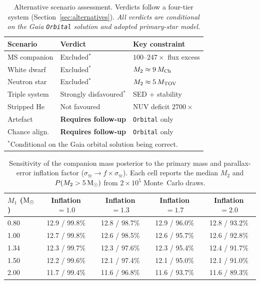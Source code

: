 \documentclass[usenatbib,fleqn]{mnras}
\newcommand{\Msun}{{\rm M}_\odot}
\begin{document}
\begin{table}
\centering
\caption{Alternative scenario assessment. Verdicts follow a
four-tier system (Section~\ref{sec:alternatives}).
\emph{All verdicts are conditional on the Gaia \texttt{Orbital}
solution and adopted primary-star model.}}
\label{tab:scenarios}
\begin{tabular}{lll}
\toprule
Scenario & Verdict & Key constraint \\
\midrule
MS companion    & Excluded$^*$  & $100$--$247\times$ flux excess \\
White dwarf     & Excluded$^*$  & $M_2 \approx 9\,M_{\rm Ch}$ \\
Neutron star    & Excluded$^*$  & $M_2 \approx 5\,M_{\rm TOV}$ \\
Triple system   & Strongly disfavoured$^*$  & SED + stability \\
Stripped He     & Not favoured  & NUV deficit $2700\times$ \\
Artefact        & \textbf{Requires follow-up} & \texttt{Orbital} only \\
Chance align.   & \textbf{Requires follow-up} & \texttt{Orbital} only \\
\bottomrule
\multicolumn{3}{l}{\footnotesize $^*$Conditional on the Gaia orbital
solution being correct.}\\
\end{tabular}
\end{table}

\begin{table}
\centering
\caption{Sensitivity of the companion mass posterior to the primary
mass and parallax-error inflation factor
($\sigma_\varpi \to f \times \sigma_\varpi$).
Each cell reports the median $M_2$ and $P(M_2 > 5\,\Msun)$
from $2 \times 10^5$ Monte~Carlo draws.}
\label{tab:sensitivity}
\begin{tabular}{lcccc}
\toprule
$M_1$ ($\Msun$) & Inflation $= 1.0$ & Inflation $= 1.3$ &
Inflation $= 1.7$ & Inflation $= 2.0$ \\
\midrule
0.80 & 12.9 / 99.8\% & 12.8 / 98.7\% & 12.9 / 96.0\% & 12.8 / 93.2\% \\
1.00 & 12.7 / 99.8\% & 12.6 / 98.5\% & 12.6 / 95.7\% & 12.6 / 92.8\% \\
1.34 & 12.3 / 99.7\% & 12.3 / 97.6\% & 12.3 / 95.4\% & 12.4 / 91.7\% \\
1.50 & 12.2 / 99.6\% & 12.1 / 97.4\% & 12.1 / 95.0\% & 12.1 / 91.0\% \\
2.00 & 11.7 / 99.4\% & 11.6 / 96.8\% & 11.6 / 93.7\% & 11.6 / 89.3\% \\
\bottomrule
\end{tabular}
\end{table}
\end{document}
